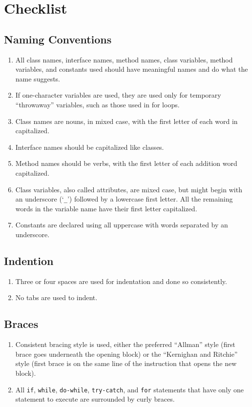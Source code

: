 \documentclass{article}
\begin{document}
\section{Checklist}
\subsection*{Naming Conventions}
\begin{enumerate}
\item All class names, interface names, method names, class variables, method variables, and constants used should have meaningful names and do what the name suggests.
\item If one-character variables are used, they are used only for temporary “throwaway” variables, such as those used in for loops.
\item Class names are nouns, in mixed case, with the first letter of each word in capitalized.
\item Interface names should be capitalized like classes.
\item Method names should be verbs, with the first letter of each addition word capitalized.
\item Class variables, also called attributes, are mixed case, but might begin with an underscore (`\texttt{\_}') followed by a lowercase first letter. All the remaining words in the variable name have their first letter capitalized.
\item Constants are declared using all uppercase with words separated by an underscore.
\end{enumerate}

\subsection*{Indention}\begin{enumerate}[resume]
\item Three or four spaces are used for indentation and done so consistently.
\item No tabs are used to indent.
\end{enumerate}

\subsection*{Braces}\begin{enumerate}[resume]
\item Consistent bracing style is used, either the preferred “Allman” style (first brace goes underneath the opening block) or the “Kernighan and Ritchie” style (first brace is on the same line of the instruction that opens the new block).
\item All \texttt{if}, \texttt{while}, \texttt{do-while}, \texttt{try-catch}, and \texttt{for} statements that have only one statement to execute are surrounded by curly braces.
\end{enumerate}
\end{document}
